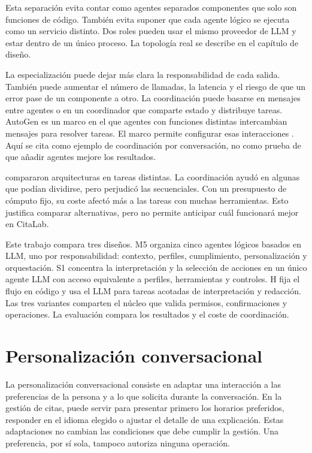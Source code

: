 Esta separación evita contar como agentes separados componentes que solo son
funciones de código. También evita suponer que cada agente lógico se ejecuta
como un servicio distinto. Dos roles pueden usar el mismo proveedor de LLM y
estar dentro de un único proceso. La topología real se describe en el capítulo
de diseño.

La especialización puede dejar más clara la responsabilidad de cada salida.
También puede aumentar el número de llamadas, la latencia y el riesgo de que
un error pase de un componente a otro. La coordinación puede basarse en
mensajes entre agentes o en un coordinador que comparte estado y distribuye
tareas. AutoGen es un marco en el que agentes con funciones distintas
intercambian mensajes para resolver tareas. El marco permite configurar
esas interacciones \citep{wu2024autogen}. Aquí se cita como ejemplo de
coordinación por conversación, no como prueba de que añadir agentes mejore los
resultados.

\citet{kim2026scalingagents} compararon arquitecturas en tareas distintas. La coordinación
ayudó en algunas que podían dividirse, pero perjudicó las secuenciales. Con un
presupuesto de cómputo fijo, su coste afectó más a las tareas con muchas
herramientas. Esto justifica comparar alternativas, pero no permite anticipar
cuál funcionará mejor en CitaLab.

Este trabajo compara tres diseños. M5 organiza cinco agentes lógicos basados
en LLM, uno por responsabilidad: contexto, perfiles, cumplimiento,
personalización y orquestación. S1 concentra la interpretación y la selección
de acciones en un único agente LLM con acceso equivalente a perfiles,
herramientas y controles. H fija el flujo en código y usa el LLM para tareas
acotadas de interpretación y redacción. Las tres variantes comparten el núcleo
que valida permisos, confirmaciones y operaciones. La evaluación compara los
resultados y el coste de coordinación.

\section{Personalización conversacional}

La personalización conversacional consiste en adaptar una interacción a las preferencias de la persona y a lo que solicita durante la conversación. En la gestión de citas, puede servir para presentar primero los horarios preferidos, responder en el idioma elegido o ajustar el detalle de una explicación. Estas adaptaciones no cambian las condiciones que debe cumplir la gestión. Una preferencia, por sí sola, tampoco autoriza ninguna operación.

